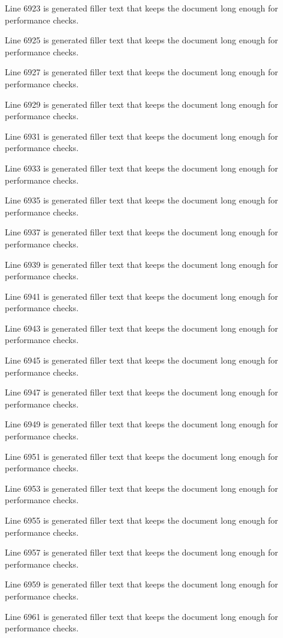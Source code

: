 Line 6923 is generated filler text that keeps the document long enough for performance checks.

Line 6925 is generated filler text that keeps the document long enough for performance checks.

Line 6927 is generated filler text that keeps the document long enough for performance checks.

Line 6929 is generated filler text that keeps the document long enough for performance checks.

Line 6931 is generated filler text that keeps the document long enough for performance checks.

Line 6933 is generated filler text that keeps the document long enough for performance checks.

Line 6935 is generated filler text that keeps the document long enough for performance checks.

Line 6937 is generated filler text that keeps the document long enough for performance checks.

Line 6939 is generated filler text that keeps the document long enough for performance checks.

Line 6941 is generated filler text that keeps the document long enough for performance checks.

Line 6943 is generated filler text that keeps the document long enough for performance checks.

Line 6945 is generated filler text that keeps the document long enough for performance checks.

Line 6947 is generated filler text that keeps the document long enough for performance checks.

Line 6949 is generated filler text that keeps the document long enough for performance checks.

Line 6951 is generated filler text that keeps the document long enough for performance checks.

Line 6953 is generated filler text that keeps the document long enough for performance checks.

Line 6955 is generated filler text that keeps the document long enough for performance checks.

Line 6957 is generated filler text that keeps the document long enough for performance checks.

Line 6959 is generated filler text that keeps the document long enough for performance checks.

Line 6961 is generated filler text that keeps the document long enough for performance checks.

